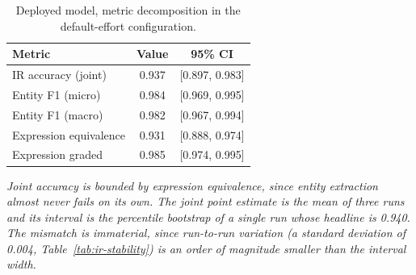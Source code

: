 \begin{table}[t]
\caption{Deployed model, metric decomposition in the default-effort configuration.}
\label{tab:ir-decomp}
\centering
\footnotesize
\begin{tabular}{@{}lcc@{}}
\toprule
Metric & Value & 95\% CI \\
\midrule
IR accuracy (joint) & 0.937 & [0.897, 0.983] \\
Entity F1 (micro) & 0.984 & [0.969, 0.995] \\
Entity F1 (macro) & 0.982 & [0.967, 0.994] \\
Expression equivalence & 0.931 & [0.888, 0.974] \\
Expression graded & 0.985 & [0.974, 0.995] \\
\bottomrule
\end{tabular}

\vspace{3pt}
\begin{minipage}{\linewidth}
\footnotesize\itshape
Joint accuracy is bounded by expression equivalence, since entity extraction almost never fails on its own.
The joint point estimate is the mean of three runs and its interval is the percentile bootstrap of a single run whose headline is 0.940. The mismatch is immaterial, since run-to-run variation (a standard deviation of 0.004, Table~\ref{tab:ir-stability}) is an order of magnitude smaller than the interval width.
\end{minipage}
\end{table}

